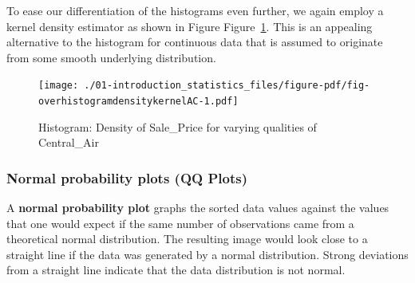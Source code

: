 \documentclass[
  letterpaper,
  DIV=11,
  numbers=noendperiod]{scrreprt}
\newenvironment{Shaded}{\begin{snugshade}}{\end{snugshade}}
\newcommand{\AttributeTok}[1]{\textcolor[rgb]{0.40,0.45,0.13}{#1}}
\newcommand{\DecValTok}[1]{\textcolor[rgb]{0.68,0.00,0.00}{#1}}
\newcommand{\FloatTok}[1]{\textcolor[rgb]{0.68,0.00,0.00}{#1}}
\newcommand{\FunctionTok}[1]{\textcolor[rgb]{0.28,0.35,0.67}{#1}}
\newcommand{\NormalTok}[1]{\textcolor[rgb]{0.00,0.23,0.31}{#1}}
\newcommand{\SpecialCharTok}[1]{\textcolor[rgb]{0.37,0.37,0.37}{#1}}
\newcommand{\StringTok}[1]{\textcolor[rgb]{0.13,0.47,0.30}{#1}}
\begin{document}
To ease our differentiation of the histograms even further, we again
employ a kernel density estimator as shown in Figure
Figure~\ref{fig-overhistogramdensitykernelAC}. This is an appealing
alternative to the histogram for continuous data that is assumed to
originate from some smooth underlying distribution.

\begin{Shaded}
\end{Shaded}

\begin{figure}[H]

{\centering \texttt{[image: ./01-introduction\_statistics\_files/figure-pdf/fig-overhistogramdensitykernelAC-1.pdf]}

}

\caption{\label{fig-overhistogramdensitykernelAC}Histogram: Density of
Sale\_Price for varying qualities of Central\_Air}

\end{figure}

\hypertarget{normal-probability-plots-qq-plots}{%
\subsubsection*{Normal probability plots (QQ
Plots)}\label{normal-probability-plots-qq-plots}}

A \textbf{normal probability plot} graphs the sorted data values against
the values that one would expect if the same number of observations came
from a theoretical normal distribution. The resulting image would look
close to a straight line if the data was generated by a normal
distribution. Strong deviations from a straight line indicate that the
data distribution is not normal.
\end{document}
